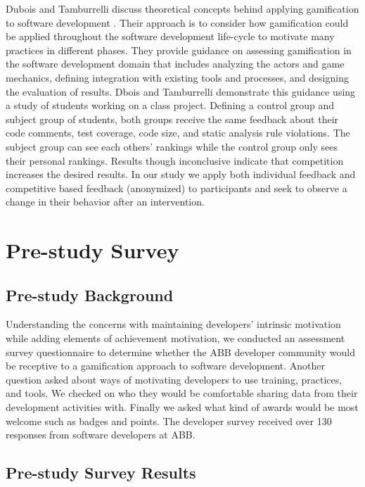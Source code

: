 \documentclass{sig-alternate}
\begin{document}
Dubois and Tamburrelli discuss theoretical concepts behind applying gamification to software development \cite{Dubois2013Understanding}. Their approach is to consider how gamification could be applied throughout the software development life-cycle to motivate many practices in different phases.  They provide guidance on assessing gamification in the software development domain that includes analyzing the actors and game mechanics, defining integration with existing tools and processes, and designing the evaluation of results.  Dbois and Tamburrelli demonstrate this guidance using a study of students working on a class project.  Defining a control group and subject group of students, both groups receive the same feedback about their code comments, test coverage, code size, and static analysis rule violations.  The subject group can see each others' rankings while the control group only sees their personal rankings.  Results though inconclusive indicate that competition increases the desired results.  In our study we apply both individual feedback and competitive based feedback (anonymized) to participants and seek to observe a change in their behavior after an intervention.

\section{Pre-study Survey}

\subsection{Pre-study Background}

Understanding the concerns with maintaining developers'  intrinsic motivation while adding elements of achievement motivation, we conducted an assessment survey questionnaire to determine whether the ABB developer community would be receptive to a gamification approach to software development.   Another question asked about ways of motivating developers to use training, practices, and tools.   We checked on who they would be comfortable sharing data from their development activities with.   Finally we asked what kind of awards would be most welcome such as badges and points. The developer survey received over 130 responses from software developers at ABB.

\subsection{Pre-study Survey Results}
\end{document}
